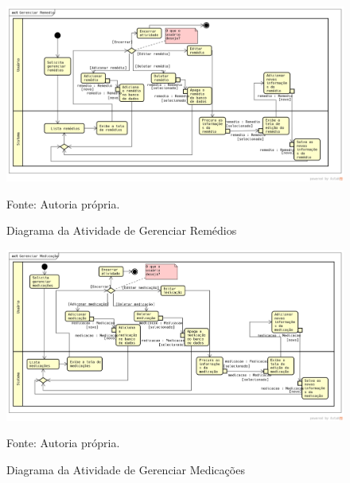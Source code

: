 \begin{apendicesenv}
\begin{figure}[H]
	\begin{center}
		\caption{Diagrama da Atividade de Gerenciar Remédios}
		\includegraphics[width=\textwidth]{../img/GerenciarRemedio.png}

		Fonte: Autoria própria.
	\end{center}
\end{figure}

\begin{figure}[H]
	\begin{center}
		\caption{ Diagrama da Atividade de Gerenciar Medicações}
		\includegraphics[width=\textwidth]{../img/GerenciarMedicacao.png}

		Fonte: Autoria própria.
	\end{center}
\end{figure}


\end{apendicesenv}
